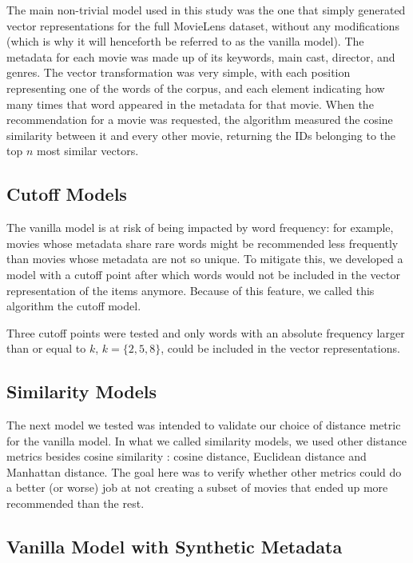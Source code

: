 The main non-trivial model used in this study was the one that simply generated
vector representations for the full MovieLens dataset, without any modifications
(which is why it will henceforth be referred to as the vanilla model). The
metadata for each movie was made up of its keywords, main cast, director, and
genres. The vector transformation was very simple, with each position
representing one of the words of the corpus, and each element indicating how
many times that word appeared in the metadata for that movie. When the
recommendation for a movie was requested, the algorithm measured the cosine
similarity between it and every other movie, returning the IDs belonging to the
top $n$ most similar vectors.

\subsection{Cutoff Models}
\label{subsec:cutoff}

The vanilla model is at risk of being impacted by word frequency: for example,
movies whose metadata share rare words might be recommended less frequently than
movies whose metadata are not so unique. To mitigate this, we developed a model
with a cutoff point after which words would not be included in the vector
representation of the items anymore. Because of this feature, we called this
algorithm the cutoff model.

Three cutoff points were tested and only words with an absolute frequency larger
than or equal to $k$, $k = \{2, 5, 8\}$, could be included in the vector
representations.

\subsection{Similarity Models}
\label{subsec:similarity}

The next model we tested was intended to validate our choice of distance metric
for the vanilla model. In what we called similarity models, we used other
distance metrics besides cosine similarity \citep{ricci_introduction_2011}:
cosine distance, Euclidean distance and Manhattan distance. The goal here was to
verify whether other metrics could do a better (or worse) job at not creating a
subset of movies that ended up more recommended than the rest.

\subsection{Vanilla Model with Synthetic Metadata}
\label{subsec:synthetic}

